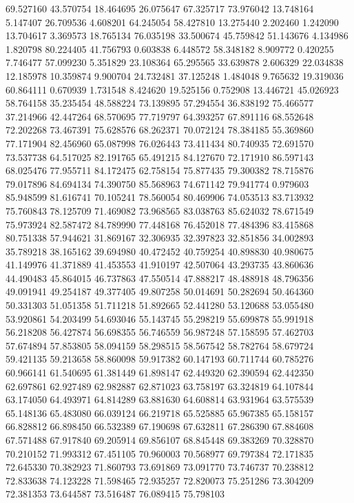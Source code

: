 69.527160
43.570754
18.464695
26.075647
67.325717
73.976042
13.748164
5.147407
26.709536
4.608201
64.245054
58.427810
13.275440
2.202460
1.242090
13.704617
3.369573
18.765134
76.035198
33.500674
45.759842
51.143676
4.134986
1.820798
80.224405
41.756793
0.603838
6.448572
58.348182
8.909772
0.420255
7.746477
57.099230
5.351829
23.108364
65.295565
33.639878
2.606329
22.034838
12.185978
10.359874
9.900704
24.732481
37.125248
1.484048
9.765632
19.319036
60.864111
0.670939
1.731548
8.424620
19.525156
0.752908
13.446721
45.026923
58.764158
35.235454
48.588224
73.139895
57.294554
36.838192
75.466577
37.214966
42.447264
68.570695
77.719797
64.393257
67.891116
68.552648
72.202268
73.467391
75.628576
68.262371
70.072124
78.384185
55.369860
77.171904
82.456960
65.087998
76.026443
73.411434
80.740935
72.691570
73.537738
64.517025
82.191765
65.491215
84.127670
72.171910
86.597143
68.025476
77.955711
84.172475
62.758154
75.877435
79.300382
78.715876
79.017896
84.694134
74.390750
85.568963
74.671142
79.941774
0.979603
85.948599
81.616741
70.105241
78.560054
80.469906
74.053513
83.713932
75.760843
78.125709
71.469082
73.968565
83.038763
85.624032
78.671549
75.973924
82.587472
84.789990
77.448168
76.452018
77.484396
83.415868
80.751338
57.944621
31.869167
32.306935
32.397823
32.851856
34.002893
35.789218
38.165162
39.694980
40.472452
40.759254
40.898830
40.980675
41.149976
41.371889
41.453553
41.910197
42.507064
43.293735
43.860636
44.490483
45.864015
46.737863
47.550514
47.888217
48.488918
48.796356
49.091941
49.254187
49.377405
49.807258
50.014691
50.282694
50.464360
50.331303
51.051358
51.711218
51.892665
52.441280
53.120688
53.055480
53.920861
54.203499
54.693046
55.143745
55.298219
55.699878
55.991918
56.218208
56.427874
56.698355
56.746559
56.987248
57.158595
57.462703
57.674894
57.853805
58.094159
58.298515
58.567542
58.782764
58.679724
59.421135
59.213658
58.860098
59.917382
60.147193
60.711744
60.785276
60.966141
61.540695
61.381449
61.898147
62.449320
62.390594
62.442350
62.697861
62.927489
62.982887
62.871023
63.758197
63.324819
64.107844
63.174050
64.493971
64.814289
63.881630
64.608814
63.931964
63.575539
65.148136
65.483080
66.039124
66.219718
65.525885
65.967385
65.158157
66.828812
66.898450
66.532389
67.190698
67.632811
67.286390
67.884608
67.571488
67.917840
69.205914
69.856107
68.845448
69.383269
70.328870
70.210152
71.993312
67.451105
70.960003
70.568977
69.797384
72.171835
72.645330
70.382923
71.860793
73.691869
73.091770
73.746737
70.238812
72.833638
74.123228
71.598465
72.935257
72.820073
75.251286
73.304209
72.381353
73.644587
73.516487
76.089415
75.798103
